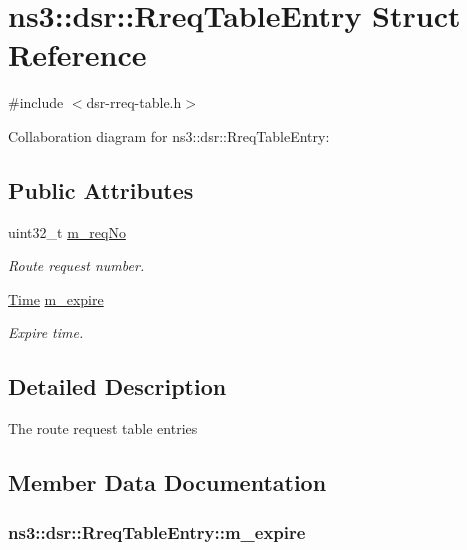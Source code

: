 \hypertarget{structns3_1_1dsr_1_1RreqTableEntry}{}\section{ns3\+:\+:dsr\+:\+:Rreq\+Table\+Entry Struct Reference}
\label{structns3_1_1dsr_1_1RreqTableEntry}


{\ttfamily \#include $<$dsr-\/rreq-\/table.\+h$>$}



Collaboration diagram for ns3\+:\+:dsr\+:\+:Rreq\+Table\+Entry\+:
\subsection*{Public Attributes}
\begin{DoxyCompactItemize}
\item 
uint32\+\_\+t \hyperlink{structns3_1_1dsr_1_1RreqTableEntry_af4725e1e7ff15ef690a09c748ab50550}{m\+\_\+req\+No}
\begin{DoxyCompactList}\small\item\em Route request number. \end{DoxyCompactList}\item 
\hyperlink{classns3_1_1Time}{Time} \hyperlink{structns3_1_1dsr_1_1RreqTableEntry_abbd10f877f926efad2b97e6e8b68f342}{m\+\_\+expire}
\begin{DoxyCompactList}\small\item\em Expire time. \end{DoxyCompactList}\end{DoxyCompactItemize}


\subsection{Detailed Description}
The route request table entries 

\subsection{Member Data Documentation}
\subsubsection[{\texorpdfstring{m\+\_\+expire}{m_expire}}]{ ns3\+::dsr\+::\+Rreq\+Table\+Entry\+::m\+\_\+expire}\hypertarget{structns3_1_1dsr_1_1RreqTableEntry_abbd10f877f926efad2b97e6e8b68f342}{}\label{structns3_1_1dsr_1_1RreqTableEntry_abbd10f877f926efad2b97e6e8b68f342}


